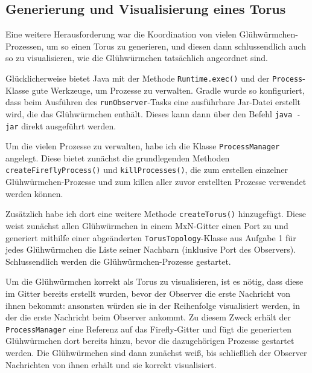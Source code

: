 \documentclass[12pt]{article}
\begin{document}
\subsection*{Generierung und Visualisierung eines Torus}
Eine weitere Herausforderung war die Koordination von vielen Glühwürmchen-Prozessen, um so einen Torus zu generieren, und diesen dann schlussendlich auch so zu visualisieren, wie die Glühwürmchen tatsächlich angeordnet sind.

Glücklicherweise bietet Java mit der Methode \texttt{Runtime.exec()} und der \texttt{Process}-Klasse gute Werkzeuge, um Prozesse zu verwalten. Gradle wurde so konfiguriert, dass beim Ausführen des \texttt{runObserver}-Tasks eine ausführbare Jar-Datei erstellt wird, die das Glühwürmchen enthält. Dieses kann dann über den Befehl \texttt{java -jar} direkt ausgeführt werden.

Um die vielen Prozesse zu verwalten, habe ich die Klasse \texttt{ProcessManager} angelegt. Diese bietet zunächst die grundlegenden Methoden \texttt{createFireflyProcess()} und \texttt{killProcesses()}, die zum erstellen einzelner Glühwürmchen-Prozesse und zum killen aller zuvor erstellten Prozesse verwendet werden können.

Zusätzlich habe ich dort eine weitere Methode \texttt{createTorus()} hinzugefügt. Diese weist zunächst allen Glühwürmchen in einem MxN-Gitter einen Port zu und generiert mithilfe einer abgeänderten \texttt{TorusTopology}-Klasse aus Aufgabe 1 für jedes Glühwürmchen die Liste seiner Nachbarn (inklusive Port des Observers). Schlussendlich werden die Glühwürmchen-Prozesse gestartet.

Um die Glühwürmchen korrekt als Torus zu visualisieren, ist es nötig, dass diese im Gitter bereits erstellt wurden, bevor der Observer die erste Nachricht von ihnen bekommt: ansonsten würden sie in der Reihenfolge visualisiert werden, in der die erste Nachricht beim Observer ankommt. Zu diesem Zweck erhält der \texttt{ProcessManager} eine Referenz auf das Firefly-Gitter und fügt die generierten Glühwürmchen dort bereits hinzu, bevor die dazugehörigen Prozesse gestartet werden. Die Glühwürmchen sind dann zunächst weiß, bis schließlich der Observer Nachrichten von ihnen erhält und sie korrekt visualisiert.
\end{document}
